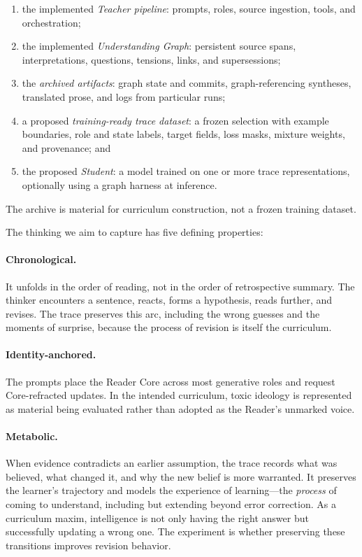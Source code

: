 \documentclass[11pt]{article}
\begin{document}
\begin{enumerate}[leftmargin=*,itemsep=0.35em]
    \item the implemented \emph{Teacher pipeline}: prompts, roles, source
    ingestion, tools, and orchestration;
    \item the implemented \emph{Understanding Graph}: persistent source spans,
    interpretations, questions, tensions, links, and supersessions;
    \item the \emph{archived artifacts}: graph state and commits,
    graph-referencing syntheses, translated prose, and logs from particular runs;
    \item a proposed \emph{training-ready trace dataset}: a frozen selection
    with example boundaries, role and state labels, target fields, loss masks,
    mixture weights, and provenance; and
    \item the proposed \emph{Student}: a model trained on one or more trace
    representations, optionally using a graph harness at inference.
\end{enumerate}

The archive is material for curriculum construction, not a frozen training
dataset.

The thinking we aim to capture has five defining properties:

\paragraph{Chronological.} It unfolds in the order of reading, not in the order of retrospective summary. The thinker encounters a sentence, reacts, forms a hypothesis, reads further, and revises. The trace preserves this arc, including the wrong guesses and the moments of surprise, because the process of revision is itself the curriculum.

\paragraph{Identity-anchored.} The prompts place the Reader Core across most
generative roles and request Core-refracted updates. In the intended curriculum,
toxic ideology is represented as material
being evaluated rather than adopted as the Reader's unmarked voice.

\paragraph{Metabolic.} When evidence contradicts an earlier assumption, the trace records what was believed, what changed it, and why the new belief is more warranted. It preserves the learner's trajectory and models the experience of learning---the \textit{process} of coming to understand, including but extending beyond error correction. As a curriculum maxim, intelligence is not only having the right answer but successfully updating a wrong one. The experiment is whether preserving these transitions improves revision behavior.
\end{document}
